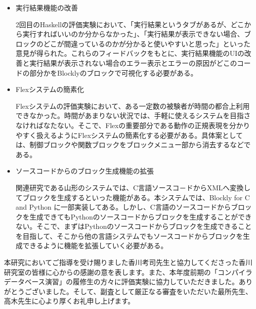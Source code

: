 \documentclass{risepaper}
\begin{document}
\begin{itemize}

\item 実行結果機能の改善

2回目のHaskellの評価実験において、「実行結果というタブがあるが、どこから実行すればいいのか分からなかった」、「実行結果が表示できない場合、ブロックのどこが間違っているのかが分かると使いやすいと思った」といった意見が得られた。これらのフィードバックをもとに、実行結果機能のUIの改善と実行結果が表示されない場合のエラー表示とエラーの原因がどこのコードの部分かをBlocklyのブロックで可視化する必要がある。

\item Flexシステムの簡素化

Flexシステムの評価実験において、ある一定数の被験者が時間の都合上利用できなかった。時間があまりない状況では、手軽に使えるシステムを目指さなければなたない。そこで、Flexの重要部分である動作の正規表現を分かりやすく扱えるようにFlexシステムの簡素化する必要がある。具体案としては、制御ブロックや関数ブロックをブロックメニュー部から消去するなどである。

\item ソースコードからのブロック生成機能の拡張

関連研究である山形のシステムでは、C言語ソースコ－ドからXMLへ変換してブロックを生成するといった機能がある。本システムでは、Blockly for C and Python に一部実装してある。しかし、C言語のソースコードからブロックを生成できてもPythonのソースコードからブロックを生成することができない。そこで、まずはPythonのソースコードからブロックを生成できることを目指して、そこから他の言語システムでもソースコードからブロックを生成できるように機能を拡張していく必要がある。

\end{itemize} 
 

\acknowledgment  %

本研究においてご指導を受け賜りました香川考司先生と協力してくださった香川研究室の皆様に心からの感謝の意を表します。また、本年度前期の「コンパイラデータベース演習」の履修生の方々に評価実験に協力していただきました。ありがとうございました。そして、副査として厳正なる審査をいただいた最所先生、高木先生に心より厚くお礼申し上げます。
\end{document}
